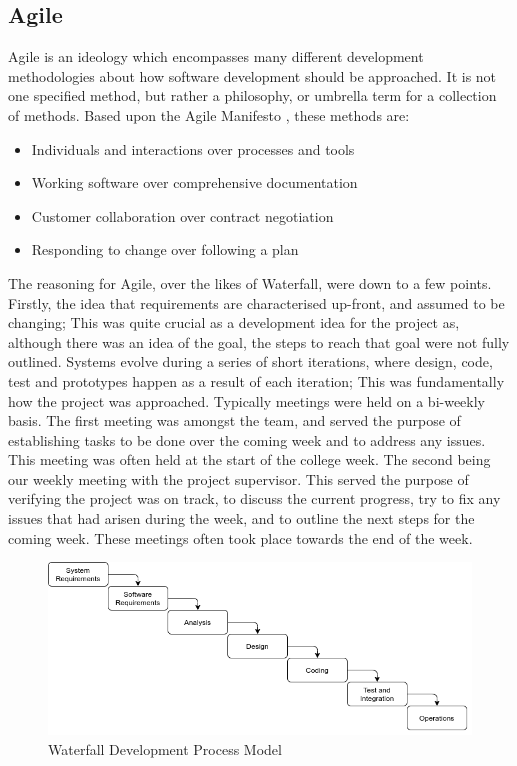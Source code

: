 \subsection{Agile}
Agile is an ideology which encompasses many different development methodologies about how software development should be approached. It is not one specified method, but rather a philosophy, or umbrella term for a collection of methods. Based upon the Agile Manifesto \cite{fowler2001agile}, these methods are:
\begin{itemize}
	\item Individuals and interactions over processes and tools
	\item Working software over comprehensive documentation
	\item Customer collaboration over contract negotiation
	\item Responding to change over following a plan
\end{itemize}
The reasoning for Agile, over the likes of Waterfall, were down to a few points. Firstly, the idea that requirements are characterised up-front, and assumed to be changing; This was quite crucial as a development idea for the project as, although there was an idea of the goal, the steps to reach that goal were not fully outlined. Systems evolve during a series of short iterations, where design, code, test and prototypes happen as a result of each iteration; This was fundamentally how the project was approached. Typically meetings were held on a bi-weekly basis. The first meeting was amongst the team, and served the purpose of establishing tasks to be done over the coming week and to address any issues. This meeting was often held at the start of the college week. The second being our weekly meeting with the project supervisor. This served the purpose of verifying the project was on track, to discuss the current progress, try to fix any issues that had arisen during the week, and to outline the next steps for the coming week. These meetings often took place towards the end of the week.

\begin{figure}[h!]
    \caption{Waterfall Development Process Model}
    \label{image:waterfallModel}
    \centering
    \includegraphics[width=1.0\textwidth]{images/WaterfallModel.png}
\end{figure}


